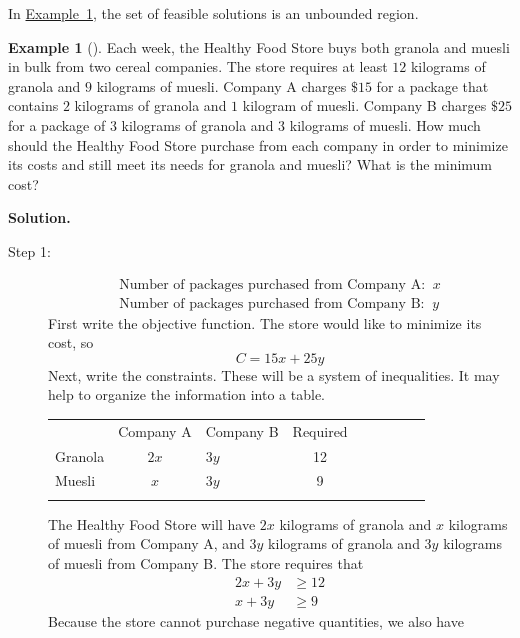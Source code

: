 \documentclass[10pt,]{book}
\theoremstyle{plain}
\theoremstyle{definition}
\theoremstyle{definition}
\newtheorem{example}[theorem]{Example}
\theoremstyle{definition}
\numberwithin{equation}{part}
\newcommand{\hrulethin}  {\noalign{\hrule height 0.04em}}
\newcommand{\amp}{&}
\begin{document}
\par
In \hyperref[example-unbounded-feasible-set]{Example~\ref{example-unbounded-feasible-set}}, the set of feasible solutions is an unbounded region.%
\begin{example}[]\label{example-unbounded-feasible-set}
Each week, the Healthy Food Store buys both granola and muesli in bulk from two cereal companies. The store requires at least \(12\) kilograms of granola and \(9\) kilograms of muesli. Company A charges \(\$15\) for a package that contains \(2\) kilograms of granola and \(1\) kilogram of muesli. Company B charges \(\$25\) for a package of \(3\) kilograms of granola and \(3\) kilograms of muesli. How much should the Healthy Food Store purchase from each company in order to minimize its costs and still meet its needs for granola and muesli? What is the minimum cost?%
\par\medskip\noindent%
\textbf{Solution.}\quad \leavevmode%
\begin{description}
\item[{Step 1:}]\hypertarget{li-34}{}%
\begin{gather*}
\text{Number of packages purchased from Company A: } ~x\\
\text{Number of packages purchased from Company B: } ~y
\end{gather*}
First write the objective function. The store would like to minimize its cost, so%
\begin{equation*}
C = 15x + 25y
\end{equation*}
Next, write the constraints. These will be a system of inequalities. It may help to organize the information into a table. \leavevmode%
\begin{table}
\centering
\begin{tabular}{AcAcAcAcA}\hrulethin
&Company A&Company B&Required\tabularnewline\hrulethin
Granola&\(2x\)&\(3y\)&12\tabularnewline\hrulethin
Muesli&\(x\)&\(3y\)&9\tabularnewline\hrulethin
\end{tabular}
\end{table}
 The Healthy Food Store will have \(2x\) kilograms of granola and \(x\) kilograms of muesli from Company A, and \(3y\) kilograms of granola and \(3y\) kilograms of muesli from Company B. The store requires that%
\begin{align*}
2x + 3y \amp\ge 12\\
x + 3y \amp\ge 9
\end{align*}
Because the store cannot purchase negative quantities, we also have%
\begin{equation*}

\end{equation*}
\end{description}
\end{example}
\end{document}
